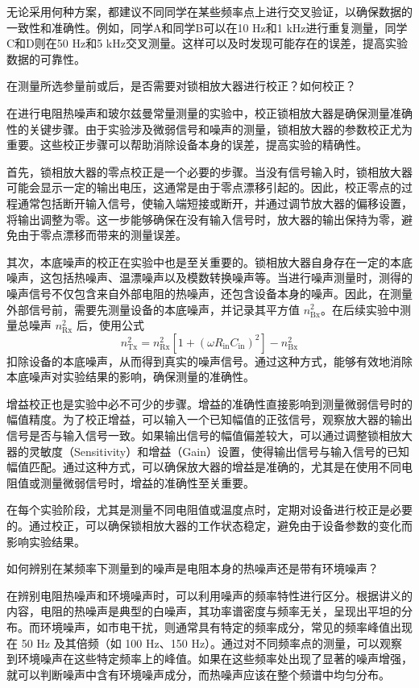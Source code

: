 无论采用何种方案，都建议不同同学在某些频率点上进行交叉验证，以确保数据的一致性和准确性。例如，同学A和同学B可以在10 Hz和1 kHz进行重复测量，同学C和D则在50 Hz和5 kHz交叉测量。这样可以及时发现可能存在的误差，提高实验数据的可靠性。

\begin{question}
	在测量所选参量前或后，是否需要对锁相放大器进行校正？如何校正？
\end{question}
在进行电阻热噪声和玻尔兹曼常量测量的实验中，校正锁相放大器是确保测量准确性的关键步骤。由于实验涉及微弱信号和噪声的测量，锁相放大器的参数校正尤为重要。这些校正步骤可以帮助消除设备本身的误差，提高实验的精确性。

首先，锁相放大器的零点校正是一个必要的步骤。当没有信号输入时，锁相放大器可能会显示一定的输出电压，这通常是由于零点漂移引起的。因此，校正零点的过程通常包括断开输入信号，使输入端短接或断开，并通过调节放大器的偏移设置，将输出调整为零。这一步能够确保在没有输入信号时，放大器的输出保持为零，避免由于零点漂移而带来的测量误差。

其次，本底噪声的校正在实验中也是至关重要的。锁相放大器自身存在一定的本底噪声，这包括热噪声、温漂噪声以及模数转换噪声等。当进行噪声测量时，测得的噪声信号不仅包含来自外部电阻的热噪声，还包含设备本身的噪声。因此，在测量外部信号前，需要先测量设备的本底噪声，并记录其平方值 \( n_{\text{Bx}}^2 \)。在后续实验中测量总噪声 \( n_{\text{Rx}}^2 \) 后，使用公式
\[
n_{\text{Tx}}^2 = n_{\text{Rx}}^2 \left[ 1 + (\omega R_{\text{in}}C_{\text{in}})^2 \right] - n_{\text{Bx}}^2
\]
扣除设备的本底噪声，从而得到真实的噪声信号。通过这种方式，能够有效地消除本底噪声对实验结果的影响，确保测量的准确性。

增益校正也是实验中必不可少的步骤。增益的准确性直接影响到测量微弱信号时的幅值精度。为了校正增益，可以输入一个已知幅值的正弦信号，观察放大器的输出信号是否与输入信号一致。如果输出信号的幅值偏差较大，可以通过调整锁相放大器的灵敏度（Sensitivity）和增益（Gain）设置，使得输出信号与输入信号的已知幅值匹配。通过这种方式，可以确保放大器的增益是准确的，尤其是在使用不同电阻值或测量微弱信号时，增益的准确性至关重要。

在每个实验阶段，尤其是测量不同电阻值或温度点时，定期对设备进行校正是必要的。通过校正，可以确保锁相放大器的工作状态稳定，避免由于设备参数的变化而影响实验结果。

\begin{question}
	如何辨别在某频率下测量到的噪声是电阻本身的热噪声还是带有环境噪声？
\end{question}
在辨别电阻热噪声和环境噪声时，可以利用噪声的频率特性进行区分。根据讲义的内容，电阻的热噪声是典型的白噪声，其功率谱密度与频率无关，呈现出平坦的分布。而环境噪声，如市电干扰，则通常具有特定的频率成分，常见的频率峰值出现在 50 Hz 及其倍频（如 100 Hz、150 Hz）。通过对不同频率点的测量，可以观察到环境噪声在这些特定频率上的峰值。如果在这些频率处出现了显著的噪声增强，就可以判断噪声中含有环境噪声成分，而热噪声应该在整个频谱中均匀分布。

